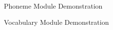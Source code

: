 \begin{figure}[th]
    \centering
    \caption{Phoneme Module Demonstration}\label{fig:demo_p}
\end{figure}

\begin{figure}[th]
    \centering
    \caption{Vocabulary Module Demonstration}
    \label{fig:demo_v}
\end{figure}

